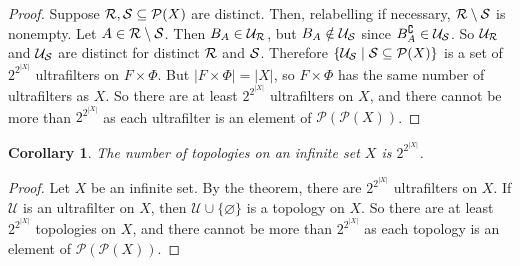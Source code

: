 \documentclass[12pt]{article}
\newtheorem*{cor*}{Corollary}
\def\powerset#1{\mathcal{P}(#1)}
\begin{document}
\begin{proof}
Suppose ${\cal R},{\cal S}\subseteq\powerset{X}$ are distinct.
Then, relabelling if necessary, ${\cal R}\setminus {\cal S}$ is nonempty.
Let $A\in{\cal R}\setminus {\cal S}$.
Then $B_A\in{\cal U}_{\cal R}$,
but $B_A\notin{\cal U}_{\cal S}$ since $B_A^\complement\in{\cal U}_{\cal S}$.
So ${\cal U}_{\cal R}$ and ${\cal U}_{\cal S}$ are distinct
for distinct $\cal R$ and $\cal S$.
Therefore $\{{\cal U}_{\cal S}\mid{\cal S}\subseteq\powerset{X}\}$ is
a set of $2^{2^{|X|}}$ ultrafilters on $F\times\Phi$.
But $|F\times\Phi|=|X|$,
so $F\times\Phi$ has the same number of ultrafilters as $X$.
So there are at least $2^{2^{|X|}}$ ultrafilters on $X$,
and there cannot be more than $2^{2^{|X|}}$
as each ultrafilter is an element of $\powerset{\powerset{X}}$.
\end{proof}

\begin{cor*}
The number of topologies on an infinite set $X$ is $2^{2^{|X|}}$.
\end{cor*}

\begin{proof}
Let $X$ be an infinite set.
By the theorem, there are $2^{2^{|X|}}$ ultrafilters on $X$.
If $\mathcal{U}$ is an ultrafilter on $X$,
then $\mathcal{U}\cup\{\varnothing\}$ is a topology on $X$.
So there are at least $2^{2^{|X|}}$ topologies on $X$,
and there cannot be more than $2^{2^{|X|}}$
as each topology is an element of $\powerset{\powerset{X}}$.
\end{proof}

\end{document}
